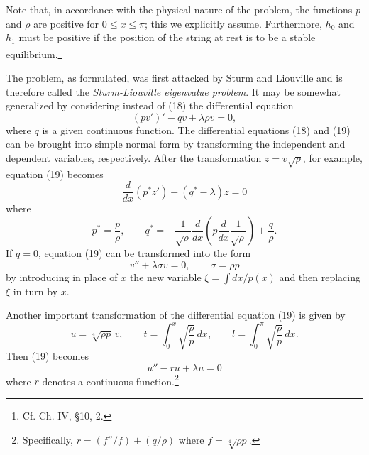 Note that, in accordance with the physical nature of the problem, the functions $p$ and $\rho$ are positive for $0\le x\le\pi$; this we explicitly assume. Furthermore, $h_0$ and $h_1$ must be positive if the position of the string at rest is to be a stable equilibrium.\footnote{Cf. Ch. IV, \S10, 2.}

The problem, as formulated, was first attacked by Sturm and Liouville and is therefore called the \emph{Sturm-Liouville eigenvalue problem}. It may be somewhat generalized by considering instead of (18) the differential equation
\begin{equation}\tag{19}
(pv')'-qv+\lambda\rho v=0,
\end{equation}
where $q$ is a given continuous function. The differential equations (18) and (19) can be brought into simple normal form by transforming the independent and dependent variables, respectively. After the transformation $z=v\sqrt{\rho}$, for example, equation (19) becomes
\begin{equation}\tag{20}
\frac d{dx}(p^*z')-(q^*-\lambda)z=0
\end{equation}
where
\[
p^*=\frac p\rho,
\qquad
q^*=-\frac1{\sqrt\rho}\frac d{dx}\left(p\frac d{dx}\frac1{\sqrt\rho}\right)+\frac q\rho.
\]
If $q=0$, equation (19) can be transformed into the form
\[
v''+\lambda\sigma v=0,
\qquad
\sigma=\rho p
\]
by introducing in place of $x$ the new variable $\xi=\int dx/p(x)$ and then replacing $\xi$ in turn by $x$.

Another important transformation of the differential equation (19) is given by
\begin{equation}\tag{20a}
u=\sqrt[4]{\rho p}\,v,
\qquad
t=\int_0^x\sqrt{\frac\rho p}\,dx,
\qquad
l=\int_0^\pi\sqrt{\frac\rho p}\,dx.
\end{equation}
Then (19) becomes
\begin{equation}\tag{19a}
u''-ru+\lambda u=0
\end{equation}
where $r$ denotes a continuous function.\footnote{Specifically, $r=(f''/f)+(q/\rho)$ where $f=\sqrt[4]{\rho p}$.}

